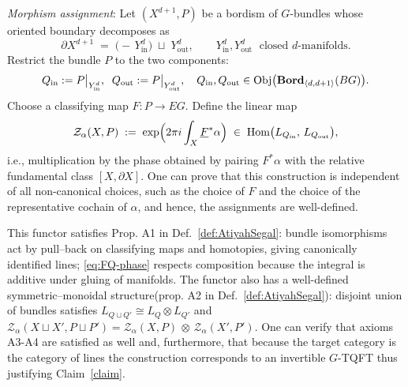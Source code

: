 \documentclass[aps,prx,reprint,superscriptaddress,twocolumn,amsmath,amssymb,amsfonts, nofootinbib]{revtex4-2}
\newcommand{\bordd}{{\bf Bord}_{\langle d, d+1\rangle}}
\theoremstyle{apsstyle}
\begin{document}
\bigskip

\noindent\textit{Morphism assignment}:
Let $(X^{d+1},P)$ be a bordism of $G$-bundles whose oriented
boundary decomposes as
\begin{equation*}
   \partial X^{d+1}
     \;=\;
     \bigl(-\,Y^{d}_{\mathrm{in}}\bigr)\;\sqcup\;Y^{d}_{\mathrm{out}},
   \qquad
   Y^{d}_{\mathrm{in}},Y^{d}_{\mathrm{out}}\;\text{ closed }d\text{-manifolds}.
\end{equation*}
Restrict the bundle $P$ to the two components:
\begin{equation*}
   Q_{\mathrm{in}}:=P\bigl|_{Y^{d}_{\mathrm{in}}},
   \;\;
   Q_{\mathrm{out}}:=P\bigl|_{Y^{d}_{\mathrm{out}}},
   \quad Q_{\mathrm{in}},Q_{\mathrm{out}}\in\mathrm{Obj}\bigl(\bordd(BG)\bigr).
\end{equation*}
Choose a classifying map $F:P \to EG$. Define the linear map
\begin{equation}\label{eq:FQ-phase}
   \mathcal Z_\alpha(X,P)\;:=\;
   \exp \Bigl(2\pi i \int_{X}\underline{F}^{*}\alpha\Bigr)
   \;\in\;
   \text{Hom} \bigl(L_{Q_{\mathrm{in}}},\,L_{Q_{\mathrm{out}}}\bigr),
\end{equation}
i.e., multiplication by the phase obtained by pairing
$F^{*}\alpha$ with the relative fundamental class
$[X,\partial X]$. One can prove that this construction is independent of all non-canonical choices, such as the choice of $F$ and the choice of the representative cochain of $\alpha$, and hence, the assignments are well-defined.

\bigskip 

\noindent This functor satisfies Prop. A1 in Def.~\ref{def:AtiyahSegal}: bundle isomorphisms act by pull–back on classifying maps and homotopies, giving canonically identified lines;
\eqref{eq:FQ-phase} respects composition because the integral is
additive under gluing of manifolds. The functor also has a well-defined symmetric–monoidal structure(prop. A2 in Def.~\ref{def:AtiyahSegal}): disjoint union of bundles satisfies $L_{Q\sqcup Q'}\cong L_{Q}\otimes L_{Q'}$ and $\mathcal Z_\alpha(X\sqcup X',P\sqcup P') =\mathcal Z_\alpha(X,P)\,\otimes\,\mathcal Z_\alpha(X',P')$. One can verify that axioms A3-A4 are satisfied as well and, furthermore, that because the target category is the category of lines the construction corresponds to an invertible $G$-TQFT thus justifying Claim~\ref{claim}.

\bigskip
\end{document}

